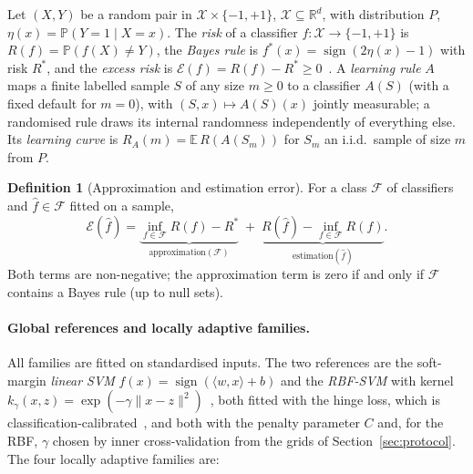 \documentclass[11pt,a4paper]{article}
\theoremstyle{plain}
\theoremstyle{definition}
\newtheorem{definition}[theorem]{Definition}
\theoremstyle{remark}
\newcommand{\R}{\mathbb{R}}
\newcommand{\E}{\mathbb{E}}
\newcommand{\Prob}{\mathbb{P}}
\newcommand{\sgn}{\operatorname{sign}}
\newcommand{\Risk}{R}
\begin{document}
Let $(X,Y)$ be a random pair in $\mathcal X\times\{-1,+1\}$, $\mathcal X\subseteq\R^d$, with distribution $P$, $\eta(x)=\Prob(Y=1\mid X=x)$. The \emph{risk} of a classifier $f\colon\mathcal X\to\{-1,+1\}$ is $\Risk(f)=\Prob(f(X)\neq Y)$, the \emph{Bayes rule} is $f^*(x)=\sgn(2\eta(x)-1)$ with risk $\Risk^*$, and the \emph{excess risk} is $\mathcal E(f)=\Risk(f)-\Risk^*\ge 0$~\citep{devroye1996}. A \emph{learning rule} $A$ maps a finite labelled sample $S$ of any size $m\ge0$ to a classifier $A(S)$ (with a fixed default for $m=0$), with $(S,x)\mapsto A(S)(x)$ jointly measurable; a randomised rule draws its internal randomness independently of everything else. Its \emph{learning curve} is $\Risk_A(m)=\E\,\Risk(A(S_m))$ for $S_m$ an i.i.d.\ sample of size $m$ from $P$.

\begin{definition}[Approximation and estimation error]\label{def:decomp}
For a class $\mathcal F$ of classifiers and $\hat f\in\mathcal F$ fitted on a sample,
\[
\mathcal E(\hat f)=\underbrace{\inf_{f\in\mathcal F}\Risk(f)-\Risk^*}_{\text{approximation}(\mathcal F)}\;+\;\underbrace{\Risk(\hat f)-\inf_{f\in\mathcal F}\Risk(f)}_{\text{estimation}(\hat f)} .
\]
Both terms are non-negative; the approximation term is zero if and only if $\mathcal F$ contains a Bayes rule (up to null sets).
\end{definition}

\paragraph{Global references and locally adaptive families.} All families are fitted on standardised inputs. The two references are the soft-margin \emph{linear SVM} $f(x)=\sgn(\langle w,x\rangle+b)$ and the \emph{RBF-SVM} with kernel $k_\gamma(x,z)=\exp(-\gamma\|x-z\|^2)$~\citep{cortes1995,vapnik1998,chang2011}, both fitted with the hinge loss, which is classification-calibrated~\citep{zhang2004,bartlett2006}, and both with the penalty parameter $C$ and, for the RBF, $\gamma$ chosen by inner cross-validation from the grids of Section~\ref{sec:protocol}. The four locally adaptive families are:
\end{document}
